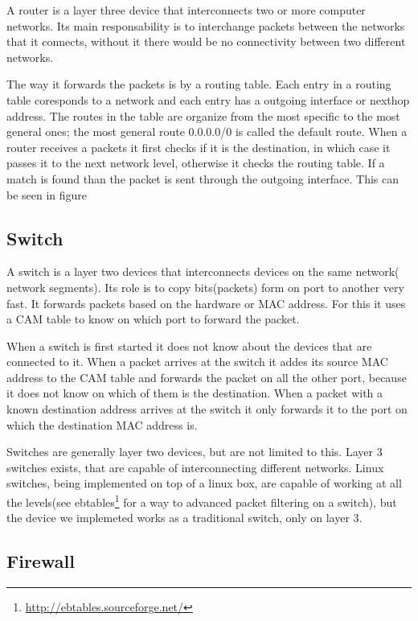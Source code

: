 A router is a layer three device that interconnects two or more computer networks. Its main responsability
is to interchange packets between the networks that it connects, without it there would be no connectivity 
between two different networks.

The way it forwards the packets is by a routing table. Each entry in a routing table coresponds to a network
and each entry has a outgoing interface or nexthop address. The routes in the table are organize from the most specific
to the most general ones; the most general route 0.0.0.0/0 is called the default route. When a router receives a packets it 
first checks if it is the destination, in which case it passes it to the next network level, otherwise it checks the routing
table. If a match is found than the packet is sent through the outgoing interface. This can be seen in figure 


\subsection{Switch}
\label{sub-sec:switch}

A switch is a layer two devices that interconnects devices on the same network( network segments). Its role is 
to copy bits(packets) form on port to another very fast. It forwards packets based on the hardware or MAC address. 
For this it uses a CAM table to know on which port to forward the packet. 

When a switch is first started it does not know about the devices that are connected to it. When a packet arrives
at the switch it addes its source MAC address to the CAM table and forwards the packet on all the other port, because
it does not know on which of them is the destination. When a packet with a known destination address arrives at the
switch it only forwards it to the port on which the destination MAC address is.

Switches are generally layer two devices, but are not limited to this. Layer 3 switches exists, that are capable of 
interconnecting different networks. Linux switches, being implemented on top of a linux box, are capable of working
at all the levels(see ebtables\footnote{\url{http://ebtables.sourceforge.net/}} for a way to advanced packet filtering
on a switch), but the device we implemeted works as a traditional switch, only on layer 3.

\subsection{Firewall}
\label{sub-sec:firewall}

